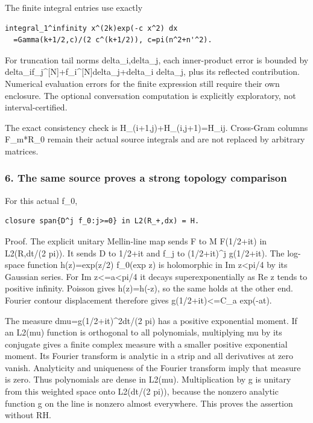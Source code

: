 The finite integral entries use exactly

\begin{verbatim}
integral_1^infinity x^(2k)exp(-c x^2) dx
  =Gamma(k+1/2,c)/(2 c^(k+1/2)), c=pi(n^2+n'^2).
\end{verbatim}

For truncation tail norms delta\_i,delta\_j, each inner-product error is bounded by
delta\_i\textbar\textbar f\_j\^{}{[}N{]}\textbar\textbar+\textbar\textbar f\_i\^{}{[}N{]}\textbar\textbar delta\_j+delta\_i
delta\_j, plus its reflected contribution. Numerical evaluation errors for the finite expression
still require their own enclosure. The optional conversation computation is explicitly exploratory,
not interval-certified.

The exact consistency check is H\_(i+1,j)+H\_(i,j+1)=H\_ij. Cross-Gram columns F\_m*R\_0 remain
their actual source integrals and are not replaced by arbitrary matrices.

\subsubsection{6. The same source proves a strong topology
comparison}\label{pr_13:the-same-source-proves-a-strong-topology-comparison}

For this actual f\_0,

\begin{verbatim}
closure span{D^j f_0:j>=0} in L2(R_+,dx) = H.
\end{verbatim}

Proof. The explicit unitary Mellin-line map sends F to M F(1/2+it) in L2(R,dt/(2 pi)). It sends D to
1/2+it and f\_j to (1/2+it)\^{}j g(1/2+it). The log-space function h(z)=exp(z/2) f\_0(exp z) is
holomorphic in \textbar Im z\textbar\textless pi/4 by its Gaussian series. For \textbar Im
z\textbar\textless=a\textless pi/4 it decays superexponentially as Re z tends to positive infinity.
Poisson gives h(z)=h(-z), so the same holds at the other end. Fourier contour displacement therefore
gives \textbar g(1/2+it)\textbar\textless=C\_a exp(-a\textbar t\textbar).

The measure dmu=\textbar g(1/2+it)\textbar\^{}2dt/(2 pi) has a positive exponential moment. If an
L2(mu) function is orthogonal to all polynomials, multiplying mu by its conjugate gives a finite
complex measure with a smaller positive exponential moment. Its Fourier transform is analytic in a
strip and all derivatives at zero vanish. Analyticity and uniqueness of the Fourier transform imply
that measure is zero. Thus polynomials are dense in L2(mu). Multiplication by g is unitary from this
weighted space onto L2(dt/(2 pi)), because the nonzero analytic function g on the line is nonzero
almost everywhere. This proves the assertion without RH.

